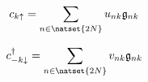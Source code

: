 \documentclass[../main.tex]{subfile}
\begin{document}
\begin{center}
    \begin{minipage}{0.4\textwidth}
    \begin{equation}\label{eq:BdG_transf_c}
        c_{k\uparrow} = \sum_{n\in\natset{2N}} u_{nk}\mathfrak{g}_{nk} 
    \end{equation}
    \end{minipage}\hspace{0.05\textwidth}
    \begin{minipage}{0.03\textwidth}
    \end{minipage}
    \begin{minipage}{0.45\textwidth}
        \begin{equation}
        \label{eq:BdG_transf_c_dagg}
            c_{-k\downarrow}^{\dagger} =\sum_{n\in\natset{2N}} v_{nk}\mathfrak{g}_{nk} 
        \end{equation}
    \end{minipage}
    \end{center}
\end{document}
